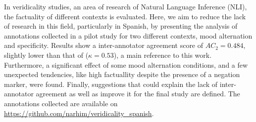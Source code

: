 In veridicality studies, an area of research of Natural Language Inference (NLI), the factuality of different contexts is evaluated. Here, we aim to reduce the lack of research in this field, particularly in Spanish, by presenting the analysis of annotations collected in a pilot study for two different contexts, mood alternation and specificity. Results show a inter-annotator agreement score of $AC_2=0.484$, slightly lower than that of \citet{de2012did} ($\kappa = 0.53$), a main reference to this work. Furthermore, a significant effect of some mood alternation conditions, and a few unexpected tendencies, like high factuallity despite the presence of a negation marker, were found. Finally, suggestions that could explain the lack of inter-annotator agreement as well as improve it for the final study are defined. The annotations collected are available on \url{https://github.com/narhim/veridicality_spanish}.